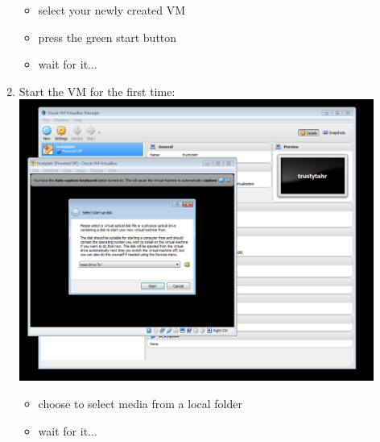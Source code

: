 \documentclass[12pt]{article}
\begin{document}
\begin{description}
\begin{enumerate}
\begin{itemize}
                 \item select your newly created VM      
                 \item press the green start button
                 \item wait for it...       
            \end{itemize}
	\newpage
\item Start the VM for the first time: \vspace{20mm} \\
      		\includegraphics[scale=.6]{Capture8.png}\\
            \begin{itemize}
                    
                 \item choose to select media from a local folder 
                 \item wait for it...
                 
            \end{itemize}
	

\end{enumerate}
\end{description}
\end{document}
